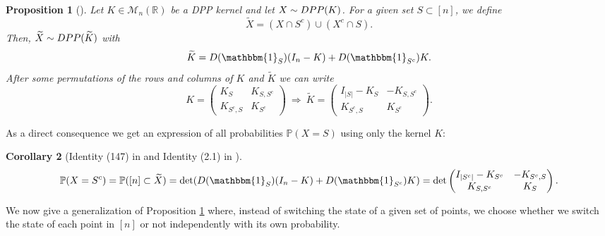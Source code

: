 \documentclass{article}
\numberwithin{equation}{section}
\renewcommand{\tilde}{\widetilde}
\newcommand{\bR}{\mathbb{R}}
\newcommand{\cara}[1]{\mathbbm{1}_{#1}}
\newcommand{\DPP}{\textnormal{DPP}}
\theoremstyle{plain}
\newtheorem{proposition}{Proposition}[section]
\newtheorem{corollary}[proposition]{Corollary}
\begin{document}
\begin{proposition}[\cite{Borodin99}]\label{prop: Particle_Hole}
Let $K\in\mathcal{M}_n(\bR)$ be a DPP kernel and let $X\sim \DPP(K)$. For a given set $S\subset [n]$, we define
\[\tilde X = (X\cap S^c) \cup (X^c\cap S).\]
Then, $\tilde X\sim \DPP(\tilde K)$ with
\begin{equation}\label{eq: PH_K}
\tilde K=D(\cara{S})(I_n-K)+D(\cara{S^c})K.
\end{equation}
After some permutations of the rows and columns of $K$ and $\tilde K$ we can write
\begin{equation}\label{eq: Particle_Hole_rowcol_permut}
K=\begin{pmatrix} K_S & K_{S, S^c} \\
K_{S^c, S} & K_{S^c}
\end{pmatrix}~\Rightarrow~\tilde K=\begin{pmatrix} I_{|S|}-K_S & -K_{S, S^c} \\
K_{S^c, S} & K_{S^c}
\end{pmatrix}.
\end{equation}
\end{proposition}

\noindent As a direct consequence we get an expression of all probabilities $\mathbb{P}(X=S)$ using only the kernel $K$:

\begin{corollary}[Identity (147) in \cite{Taskar} and Identity (2.1) in \cite{ShiraiII}]\label{corr: Alternate_LL}
\[\mathbb{P}(X=S^c)=\mathbb{P}([n]\subset \tilde X)=\det(D(\cara{S})(I_n-K)+D(\cara{S^c})K)=\det\begin{pmatrix} I_{|S^c|}-K_{S^c} & -K_{S^c, S}\\
K_{S, S^c} & K_S
\end{pmatrix}.\]
\end{corollary}

\noindent We now give a generalization of Proposition \ref{prop: Particle_Hole} where, instead of switching the state of a given set of points, we choose whether we switch the state of each point in $[n]$ or not independently with its own probability.
\end{document}
